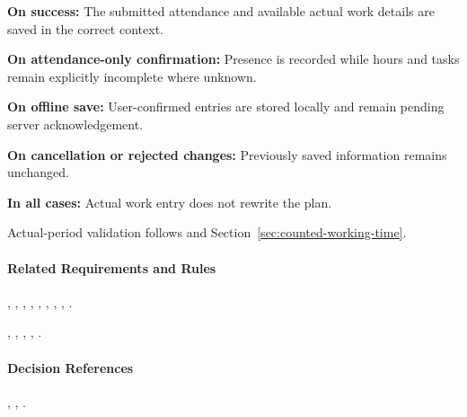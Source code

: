 \textbf{On success:}
The submitted attendance and available actual
work details are saved in the correct context.

\textbf{On attendance-only confirmation:}
Presence is recorded while hours and tasks
remain explicitly incomplete where unknown.

\textbf{On offline save:}
User-confirmed entries are stored locally
and remain pending server acknowledgement.

\textbf{On cancellation or rejected changes:}
Previously saved information remains unchanged.

\textbf{In all cases:}
Actual work entry does not rewrite the plan.

Actual-period validation follows  and Section~\ref{sec:counted-working-time}.

\paragraph{Related Requirements and Rules}
\hyperref[fr:004]{}, \hyperref[fr:016]{}, \hyperref[fr:020]{}, \hyperref[fr:030]{}, \hyperref[fr:031]{}, \hyperref[fr:032]{}, \hyperref[fr:033]{}, \hyperref[fr:034]{}, \hyperref[fr:035]{}.

\hyperref[br:011]{}, \hyperref[br:018]{}, \hyperref[br:019]{}, \hyperref[br:020]{}, \hyperref[br:021]{}.

\paragraph{Decision References}
, , .
